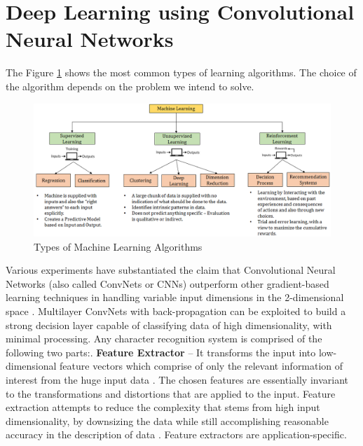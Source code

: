 \section{Deep Learning using Convolutional Neural Networks}
\label{3_1}
The Figure \ref{fig:ML_Classification} shows the most common types of learning algorithms. The choice of the algorithm depends on the problem we intend to solve.
\begin{figure}[h!]
  \centering
  \includegraphics[width=\linewidth]{figures/ML_Classification.PNG}
  \caption{Types of Machine Learning Algorithms
  \cite{upx_ml}}
  \label{fig:ML_Classification}
\end{figure}
\newline Various experiments have substantiated the claim that Convolutional Neural Networks (also called ConvNets or CNNs) outperform other gradient-based learning techniques in handling variable input dimensions in the 2-dimensional space \cite{lecun1998gradient}.
Multilayer ConvNets with back-propagation can be exploited to build a strong decision layer capable of classifying data of high dimensionality, with minimal processing. \newline \newline
Any character recognition system is comprised of the following two parts:.	\textbf{Feature Extractor }– \newline
It transforms the input into low-dimensional feature vectors which comprise of only the relevant information of interest from the huge input data \cite{wiki_fe}. The chosen features are essentially invariant to the transformations and distortions that are applied to the input. 
\newline
Feature extraction attempts to reduce the complexity that stems from high input dimensionality, by downsizing the data while still accomplishing reasonable accuracy in the description of data \cite{wiki_fe}. Feature extractors are application-specific.\newline \newline
